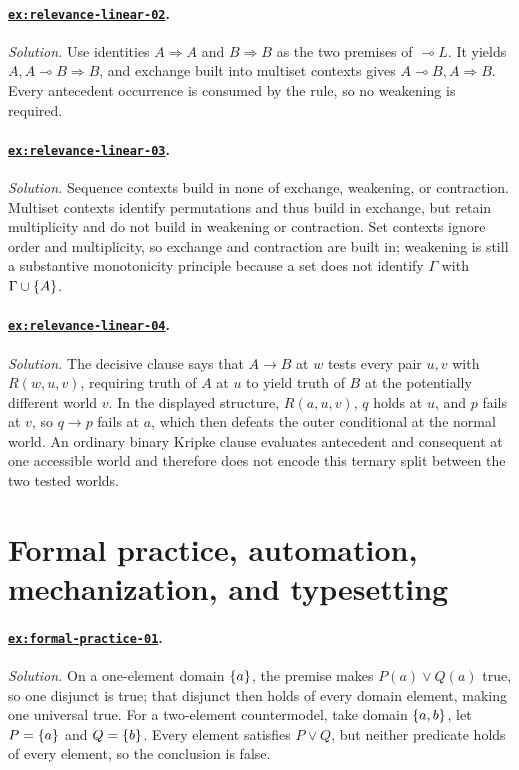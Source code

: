 \documentclass[11pt,oneside,openany]{book}
\theoremstyle{definition}
\theoremstyle{plain}
\theoremstyle{remark}
\DeclarePairedDelimiter{\set}{\lbrace}{\rbrace}
\begin{document}
\paragraph{\hyperref[ex:relevance-linear-02]{\texttt{ex:relevance-linear-02}}.}
\textit{Solution.}  Use identities \(A\Rightarrow A\) and
\(B\Rightarrow B\) as the two premises of \(\multimap L\).  It yields
\(A,A\multimap B\Rightarrow B\), and exchange built into multiset contexts
gives \(A\multimap B,A\Rightarrow B\).  Every antecedent occurrence is consumed
by the rule, so no weakening is required.

\paragraph{\hyperref[ex:relevance-linear-03]{\texttt{ex:relevance-linear-03}}.}
\textit{Solution.}  Sequence contexts build in none of exchange, weakening, or
contraction.  Multiset contexts identify permutations and thus build in
exchange, but retain multiplicity and do not build in weakening or contraction.
Set contexts ignore order and multiplicity, so exchange and contraction are
built in; weakening is still a substantive monotonicity principle because a
set does not identify \(\Gamma\) with \(\Gamma\cup\set A\).

\paragraph{\hyperref[ex:relevance-linear-04]{\texttt{ex:relevance-linear-04}}.}
\textit{Solution.}  The decisive clause says that \(A\to B\) at \(w\) tests
every pair \(u,v\) with \(R(w,u,v)\), requiring truth of \(A\) at \(u\) to
yield truth of \(B\) at the potentially different world \(v\).  In the
displayed structure, \(R(a,u,v)\), \(q\) holds at \(u\), and \(p\) fails at
\(v\), so \(q\to p\) fails at \(a\), which then defeats the outer
conditional at the normal world.  An ordinary binary Kripke clause evaluates
antecedent and consequent at one accessible world and therefore does not encode
this ternary split between the two tested worlds.

\section{Formal practice, automation, mechanization, and typesetting}

\paragraph{\hyperref[ex:formal-practice-01]{\texttt{ex:formal-practice-01}}.}
\textit{Solution.}  On a one-element domain \(\set{a}\), the premise makes
\(P(a)\lor Q(a)\) true, so one disjunct is true; that disjunct then holds of
every domain element, making one universal true.  For a two-element
countermodel, take domain \(\set{a,b}\), let \(P=\set{a}\) and
\(Q=\set{b}\).  Every element satisfies \(P\lor Q\), but neither predicate
holds of every element, so the conclusion is false.
\end{document}
